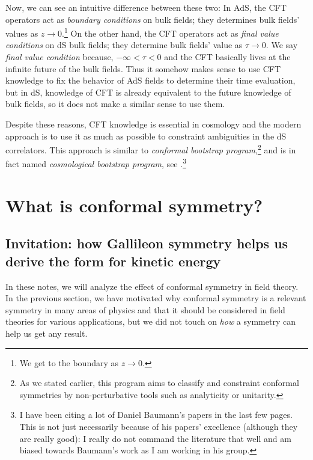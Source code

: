 \begin{itemize}
	Now, we can see an intuitive difference between these two: In AdS, the CFT operators act as \emph{boundary conditions} on bulk fields; they determines bulk fields' values as $z\rightarrow 0$.\footnote{We get to the boundary as $z\rightarrow 0$.} On the other hand, the CFT operators act as \emph{final value conditions} on dS bulk fields; they determine bulk fields' value as $\tau\rightarrow 0$. We say \emph{final value condition} because, $-\infty<\tau<0$ and the CFT basically lives at the infinite future of the bulk fields. Thus it somehow makes sense to use CFT knowledge to fix the behavior of AdS fields to determine their time evaluation, but in dS, knowledge of CFT is already equivalent to the future knowledge of bulk fields, so it does not make a similar sense to use them.
\end{itemize}

Despite these reasons, CFT knowledge is essential in cosmology and the modern approach is to use it as much as possible to constraint ambiguities in the dS correlators. This approach is similar to \emph{conformal bootstrap program},\footnote{As we stated earlier, this program aims to classify and constraint conformal symmetries by non-perturbative tools such as analyticity or unitarity.} and is in fact named \emph{cosmological bootstrap program}, see \cite{Baumann:2019oyu,Baumann:2020ksv,Baumann:2020dch}.\footnote{I have been citing a lot of Daniel Baumann's papers in the last few pages. This is not just necessarily because of his papers' excellence (although they are really good): I really do not command the literature that well and am biased towards Baumann's work as I am working in his group.}
\chapter{What is conformal symmetry?}
\section{Invitation:  how Gallileon symmetry helps us derive the form for kinetic energy}
In these notes, we will analyze the effect of conformal symmetry in field theory. In the previous section, we have motivated why conformal symmetry is a relevant symmetry in many areas of physics and that it should be considered in field theories for various applications, but we did not touch on \emph{how} a symmetry can help us get any result. 

